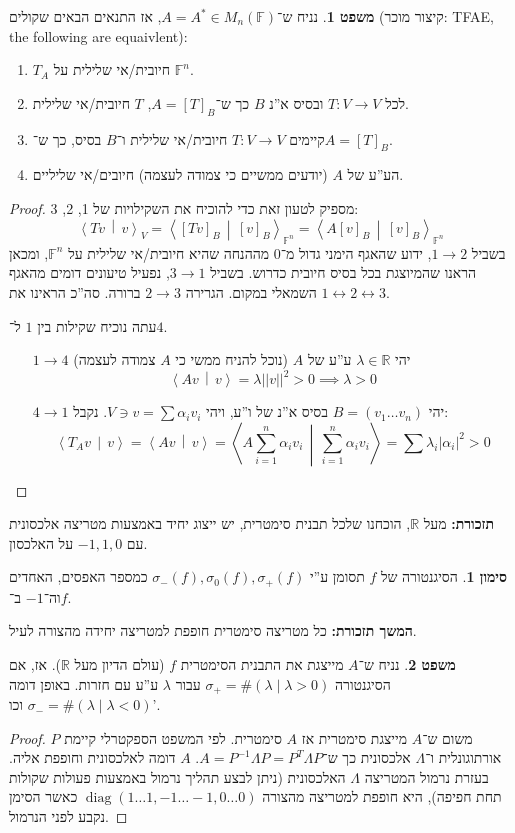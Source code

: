 \documentclass[a4paper]{article}
\newcommand\R     {\mathbb{R}}
\newcommand\ra    {\rangle}
\newcommand\la    {\langle}
\newcommand\sumnio    {\sum_{i = 1}^{n}}
\DeclareMathOperator{\diag}    {diag}
\newcommand\lra       {\leftrightarrow}
\newcommand\F         {\mathbb{F}}
\newcommand\co        {\colon}
\newcommand\norm[1]   {\left \vert \left \vert #1 \right \vert \right \vert}
\newcommand\mut [2]   {\left \la #1 \,\middle\vert\, #2 \right \ra}
\newcommand\ag        {\alpha}
\renewcommand\lg      {\lambda}
\newcommand\sg        {\sigma}
\newcommand\Lg        {\Lambda}
\newcommand\op    {^{-1}}
\theoremstyle{definition}
\newtheorem{Theorem}{\color{myblue}משפט}
\newtheorem{Notion}{\color{myred}סימון}
\newcommand\theo  [1] {\begin{Theorem}#1\end{Theorem}}
\newcommand\noti  [1] {\begin{Notion}#1\end{Notion}}
\begin{document}
	\theo{נניח ש־$A = A^* \in M_n(\F)$, אז התנאים הבאים שקולים (קיצור מוכר: TFAE, the following are equaivlent): 
		\begin{enumerate}
			\item $T_A$ חיובית/אי שלילית על $\F^n$. 
			\item לכל $T \co V \to V$ ובסיס א''נ $B$ כך ש־$A = [T]_B$, $T$ חיובית/אי שלילית. 
			\item קיימים $T \co V \to V$ חיובית/אי שלילית ו־$B$ בסיס, כך ש־$A = [T]_B$. 
			\item הע''ע של $A$ (יודעים ממשיים כי צמודה לעצמה) חיובים/אי שליליים. 
	\end{enumerate}}
	\begin{proof}
		מספיק לטעון זאת כדי להוכיח את השקילויות של 1, 2, 3: 
		\[ \mut{Tv}{v}_V = \mut{[Tv]_B}{[v]_B}_{\F^n} = \mut{A[v]_B}{[v]_B}_{\F^n} \]
		בשביל $1 \to 2$, ידוע שהאגף הימני גדול מ־$0$ מההנחה שהיא חיובית/אי שלילית על $\F^n$, ומכאן הראנו שהמיוצגת בכל בסיס חיובית כדרוש. בשביל $3 \to 1$, נפעיל טיעונים דומים מהאגף השמאלי במקום. הגרירה $2 \to 3$ ברורה. סה''כ הראינו את $1\lra2\lra 3$. 
		
		עתה נוכיח שקילות בין $1$ ל־$4$. 
		\begin{itemize}
			\item[$1 \to 4$] יהי $\lg \in \R$ ע''ע של $A$ (נוכל להניח ממשי כי $A$ צמודה לעצמה)
			\[ \mut{Av}{v} = \lg\norm{v}^2 > 0 \implies \lg > 0 \]
			\item[$4 \to 1$] יהי $B = (v_1 \dots v_n)$ בסיס א''נ של ו''ע, ויהי $V \ni v = \sum \ag_i v_i$. נקבל: 
			\[ \mut{T_Av}{v} = \mut{Av}{v} = \mut{A\sumnio \ag_i v_i}{\sumnio \ag_i v_i} = \sum \lg_i |\ag_i|^2 > 0 \]
		\end{itemize}
	\end{proof}
	
	\textbf{תזכורת: }מעל $\R$, הוכחנו שלכל תבנית סימטרית, יש ייצוג יחיד באמצעות מטריצה אלכסונית עם $-1, 1, 0$ על האלכסון. 
	\noti{הסיגנטורה של $f$ תסומן ע''י $\sg_-(f), \sg_0(f), \sg_+(f)$ כמספר האפסים, האחדים וה־$-1$ ב־$f$. }
	
	\textbf{המשך תזכורת: }כל מטריצה סימטרית חופפת למטריצה יחידה מהצורה לעיל. 
	
	\theo{נניח ש־$A$ מייצגת את התבנית הסימטרית $f$ (עולם הדיון מעל $\R$). אז, אם הסיגנטורה $\sg_+ = \#(\lg \mid \lg > 0)$ עבור $\lg$ ע''ע עם חזרות. באופן דומה $\sg_- = \#(\lg \mid \lg < 0)$ וכו'. }
	
	\begin{proof}
		משום ש־$A$ מייצגת סימטרית אז $A$ סימטרית. לפי המשפט הספקטרלי קיימת $P$ אורתוגונלית ו־$\Lg$ אלכסונית כך ש־$A = P\op\Lg P = P^T\Lg P$. $A$ דומה לאלכסונית וחופפת אליה. בעזרת נרמול המטריצה $\Lg$ האלכסונית (ניתן לבצע תהליך נרמול באמצעות פעולות שקולות תחת חפיפה), היא חופפת למטריצה מהצורה $\diag(1 \dots 1, -1 \ldots -1, 0 \ldots 0)$ כאשר הסימן נקבע לפני הנרמול. 
	\end{proof}
	
\end{document}

